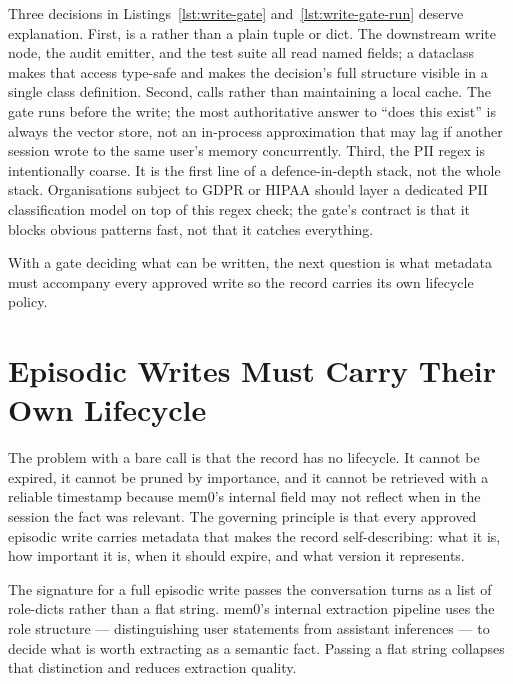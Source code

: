 Three decisions in Listings~\ref{lst:write-gate} and~\ref{lst:write-gate-run}
deserve explanation. First,  is a  rather
than a plain tuple or dict. The downstream write node, the audit emitter, and
the test suite all read named fields; a dataclass makes that access type-safe
and makes the decision's full structure visible in a single class definition.
Second,  calls  rather than maintaining a
local cache. The gate runs before the write; the most authoritative answer to
``does this exist'' is always the vector store, not an in-process approximation
that may lag if another session wrote to the same user's memory concurrently.
Third, the PII regex is intentionally coarse. It is the first line of a
defence-in-depth stack, not the whole stack. Organisations subject to GDPR or
HIPAA should layer a dedicated PII classification model on top of this regex
check; the gate's contract is that it blocks obvious patterns fast, not that
it catches everything.

With a gate deciding what can be written, the next question is what metadata
must accompany every approved write so the record carries its own lifecycle
policy.

\section{Episodic Writes Must Carry Their Own Lifecycle}
\label{sec:episodic-writes}

The problem with a bare  call is that the record has no
lifecycle. It cannot be expired, it cannot be pruned by importance, and it
cannot be retrieved with a reliable timestamp because mem0's internal
 field may not reflect when in the session the fact was
relevant. The governing principle is that every approved episodic write
carries metadata that makes the record self-describing: what it is, how
important it is, when it should expire, and what version it represents.

The  signature for a full episodic write passes the conversation
turns as a list of role-dicts rather than a flat string. mem0's internal
extraction pipeline uses the role structure --- distinguishing user statements
from assistant inferences --- to decide what is worth extracting as a semantic
fact. Passing a flat string collapses that distinction and reduces extraction
quality.

